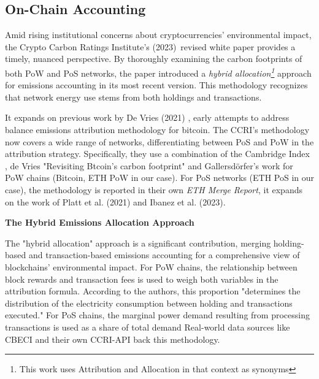 \documentclass[11pt]{report}
\begin{document}
\subsection{On-Chain Accounting \label{se:onchain-accounting}}

Amid rising institutional concerns about cryptocurrencies' environmental impact, the Crypto Carbon Ratings Institute's (2023)\ revised white paper provides a timely, nuanced perspective. By thoroughly examining the carbon footprints of both PoW and PoS networks, the paper introduced a \textit{hybrid allocation\footnote{This work uses Attribution and Allocation in that context as synonyms}} approach for emissions accounting in its most recent version. This methodology recognizes that network energy use stems from both holdings and transactions.

It expands on previous work by De Vries (2021) \cite{devriesTrueCostsDigital2021}, early attempts to address balance emissions attribution methodology for bitcoin. The CCRI's methodology now covers a wide range of networks, differentiating between PoS and PoW in the attribution strategy. Specifically, they use a combination of the Cambridge Index \cite{neumuellerCambridgeBitcoinElectricity2021}, de Vries "Revisiting Btcoin's carbon footprint" \cite{devriesRevisitingBitcoinCarbon2022} and Gallersdörfer's work \cite{gallersdorferEnergyConsumptionCryptocurrencies2020} for PoW chains (Bitcoin, ETH PoW in our case). For PoS networks (ETH PoS in our case), the methodology is reported in their own \textit{ETH Merge Report}\cite{ETHMergeReport}, it expands on the work of Platt et al. (2021)\cite{plattEnergyFootprintBlockchain2021} and Ibanez et al. (2023)\cite{ibanezEnergyConsumptionProofofStake2023}.

\textbf{The Hybrid Emissions Allocation Approach}

The "hybrid allocation" approach is a significant contribution, merging holding-based and transaction-based emissions accounting for a comprehensive view of blockchains' environmental impact. For PoW chains, the relationship between block rewards and transaction fees is used to weigh both variables in the attribution formula. According to the authors, this proportion "determines the distribution of the electricity consumption between holding and transactions executed." For PoS chains, the marginal power demand resulting from processing transactions is used as a share of total demand Real-world data sources like CBECI and their own CCRI-API back this methodology.
\end{document}

